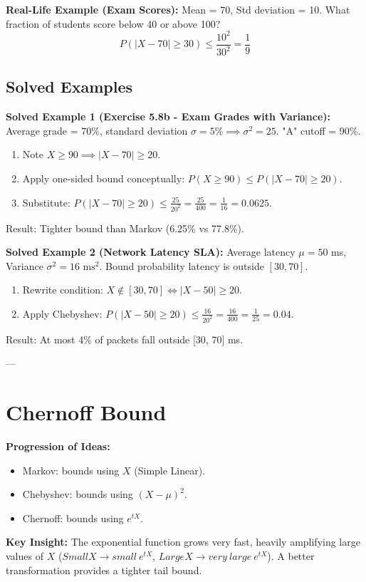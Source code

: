 \documentclass[11pt]{article}
\begin{document}
\textbf{Real-Life Example (Exam Scores):} 
Mean = 70, Std deviation = 10. What fraction of students score below 40 or above 100?
\[ P(|X - 70| \ge 30) \le \frac{10^2}{30^2} = \frac{1}{9} \]

\subsection{Solved Examples}
\textbf{Solved Example 1 (Exercise 5.8b - Exam Grades with Variance):}
Average grade = 70\%, standard deviation $\sigma = 5\% \implies \sigma^2 = 25$. "A" cutoff = 90\%.
\begin{enumerate}
    \item Note $X \ge 90 \implies |X - 70| \ge 20$.
    \item Apply one-sided bound conceptually: $P(X \ge 90) \le P(|X - 70| \ge 20)$.
    \item Substitute: $P(|X - 70| \ge 20) \le \frac{25}{20^2} = \frac{25}{400} = \frac{1}{16} = 0.0625$.
\end{enumerate}
Result: Tighter bound than Markov (6.25\% vs 77.8\%).

\textbf{Solved Example 2 (Network Latency SLA):}
Average latency $\mu = 50$ ms, Variance $\sigma^2 = 16\text{ ms}^2$. Bound probability latency is outside $[30, 70]$.
\begin{enumerate}
    \item Rewrite condition: $X \notin [30, 70] \iff |X - 50| \ge 20$.
    \item Apply Chebyshev: $P(|X - 50| \ge 20) \le \frac{16}{20^2} = \frac{16}{400} = \frac{1}{25} = 0.04$.
\end{enumerate}
Result: At most 4\% of packets fall outside [30, 70] ms.

---

\section{Chernoff Bound}

\textbf{Progression of Ideas:}
\begin{itemize}
    \item Markov: bounds using $X$ (Simple Linear).
    \item Chebyshev: bounds using $(X - \mu)^2$.
    \item Chernoff: bounds using $e^{tX}$.
\end{itemize}
\textbf{Key Insight:} The exponential function grows very fast, heavily amplifying large values of $X$ ($Small X \rightarrow small\ e^{tX}$, $Large X \rightarrow very\ large\ e^{tX}$). A better transformation provides a tighter tail bound.
\end{document}
